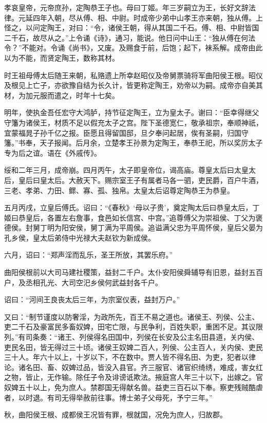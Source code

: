 \documentclass[]{article}
\begin{document}
孝哀皇帝，元帝庶孙，定陶恭王子也。母曰丁姬。年三岁嗣立为王，长好文辞法律。元延四年入朝，尽从傅、相、中尉。时成帝少弟中山孝王亦来朝，独从傅。上怪之，以问定陶王，对曰：``令，诸侯王朝，得从其国二千石。傅、相、中尉皆国二千石，故尽从之。''上令诵《诗》，通习，能说。他日问中山王：``独从傅在何法令？''不能对。令诵《尚书》，又废。及赐食于前，后饱；起下，袜系解。成帝由此以为不能，而贤定陶王，数称其材。

时王祖母傅太后随王来朝，私赂遗上所幸赵昭仪及帝舅票骑将军曲阳侯王根。昭仪及根见上亡子，亦欲豫自结为长久计，皆更称定陶王，劝帝以为嗣。成帝亦自美其材，为加元服而遣之，时年十七矣。

明年，使执金吾任宏守大鸿胪，持节征定陶王，立为皇太子。谢曰：``臣幸得继父守籓为诸侯王，材质不足以假充太子之宫。陛下圣德宽仁，敬承祖宗，奉顺神祇，宜蒙福晁子孙千亿之报。臣愿且得留国邸，旦夕奉问起居，俟有圣嗣，归国守籓。''书奉，天子报闻。后月余，立楚孝王孙景为定陶王，奉恭王祀，所以奖厉太子专为后之谊。语在《外戚传》。

绥和二年三月，成帝崩。四月丙午，太子即皇帝位，谒高庙。尊皇太后曰太皇太后，皇后曰皇太后。大赦天下。赐宗室王子有属者马各一驷，吏民爵，百户牛酒，三老、孝弟、力田、鳏、寡、孤、独帛。太皇太后诏尊定陶恭王为恭皇。

五月丙戌，立皇后傅氏。诏曰：``《春秋》`母以子贵'，奠定陶太后曰恭皇太后，丁姬曰恭皇后，各置左右詹事，食邑如长信宫、中宫。''追尊傅父为崇祖侯、丁父为褒德侯。封舅丁明为阳安侯，舅丁满为平周侯。追谥满父忠为平周怀侯，皇后父晏为孔乡侯，皇太后弟侍中光禄大夫赵钦为新成侯。

六月，诏曰：``郑声淫而乱乐，圣王所放，其罢乐府。''

曲阳侯根前以大司马建社稷策，益封二千户。太仆安阳侯舜辅导有旧恩，益封五百户，及丞相孔光、大司空汜乡侯何武益封各千户。

诏曰：``河间王良丧太后三年，为宗室仪表，益封万户。''

又曰：``制节谨度以防奢淫，为政所先，百王不易之道也。诸侯王、列侯、公主、吏二千石及豪富民多畜奴婢，田宅亡限，与民争利，百姓失职，重困不足。其议限列。''有司条奏：``诸王、列侯得名田国中，列侯在长安及公主名田县道，关内侯、吏民名田，皆无得过三十顷。诸侯王奴婢二百人，列侯、公主百人，关内侯、吏民三十人。年六十以上，十岁以下，不在数中。贾人皆不得名田、为吏，犯者以律论。诸名田、畜、奴婢过品，皆没入县官。齐三服官、诸官织绮绣，难成，害女红之物，皆止，无作输。除任子令及诽谤诋欺法。掖庭宫人年三十以下，出嫁之。官奴婢五十以上，免为庶人。禁郡国无得献名兽。益吏三百石以下奉。察吏残贼酷虐者，以时退。有司无得举赦前往事。博士弟子父母死，予宁三年。''

秋，曲阳侯王根、成都侯王况皆有罪，根就国，况免为庶人，归故郡。
\end{document}
